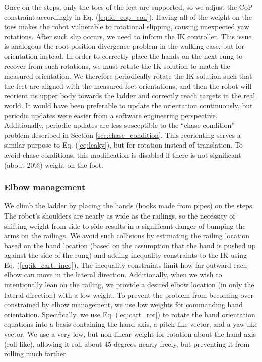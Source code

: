 \documentclass{ws-ijhr}
\newcommand{\eref}[1] {Eq. (\ref{#1})}
\newcommand{\sref}[1] {Section \ref{#1}}
\begin{document}
Once on the steps, only the toes of the feet are supported, so we adjust the 
CoP constraint accordingly in \eref{eq:id_cop_con}. Having all of the weight on the toes makes the 
robot vulnerable to rotational slipping, causing unexpected yaw rotations.
After such slip occurs, we need to inform the IK controller. 
This issue is analogous the root position divergence problem in the walking case, 
but for orientation instead.
In order to correctly place the hands on the next rung to recover from such 
rotations, we must rotate the IK solution to match the measured orientation.  
We therefore periodically rotate the IK solution such that the feet are aligned 
with the measured feet orientations, and then the robot will reorient its 
upper body towards the ladder and correctly reach targets in the real world.  
It would have been preferable to update the orientation continuously, but 
periodic updates were easier from a software engineering perspective.  
Additionally, periodic updates are less susceptible to the ``chase 
condition'' problem described in \sref{sec:chase_condition}. 
This reorienting serves a similar purpose 
to \eref{eq:leaky}, but for rotation instead of translation. 
To avoid chase conditions, this modification is disabled if there is not 
significant (about 20\%) weight on the foot.

\subsubsection{Elbow management}
We climb the ladder by placing the hands (hooks made from pipes) on the steps.
The robot's shoulders are nearly as wide as the railings, so the necessity of 
shifting weight from side to side results in a significant danger of bumping 
the arms on the railings. We avoid such collisions by estimating the railing 
location based on the hand location (based on the assumption that the hand 
is pushed up against the side of the rung) and adding inequality constraints 
to the IK using \eref{eq:ik_cart_ineq}. 
The inequality constraints limit how far outward each elbow can 
move in the lateral direction. Additionally, when we wish to intentionally 
lean on the railing, we provide a desired elbow location (in only the 
lateral direction) with a low weight. To prevent the problem from becoming 
over-constrained by elbow management, we use low weights for commanding hand 
orientation. Specifically, we use \eref{eq:cart_rot} to rotate the hand 
orientation equations into a basis containing the hand axis, a pitch-like 
vector, and a yaw-like vector. We use a very low, but non-linear weight for 
rotation about the hand axis (roll-like), allowing it roll about 45 degrees 
nearly freely, but preventing it from rolling much farther.
\end{document}
